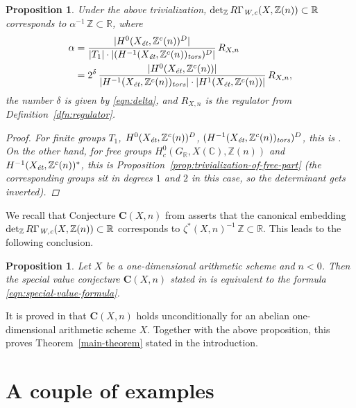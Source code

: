 \documentclass[draft]{article}
\newcommand{\CC}{\mathbb{C}}
\newcommand{\RR}{\mathbb{R}}
\newcommand{\ZZ}{\mathbb{Z}}
\renewcommand{\det}{\operatorname{det}}
\newcommand{\et}{\text{\it \'{e}t}}
\newcommand{\tors}{\text{\it tors}}
\newcommand{\Wc}{\text{\it W,c}}
\theoremstyle{myplain}
\newtheorem{proposition}[theorem]{Proposition}
\theoremstyle{mydefinition}
\numberwithin{equation}{section}
\begin{document}
\begin{proposition}
  Under the above trivialization, $\det_\ZZ R\Gamma_\Wc (X, \ZZ(n)) \subset \RR$
  corresponds to $\alpha^{-1}\,\ZZ \subset \RR$, where
  \begin{align*}
    \alpha & = \frac{|H^0 (X_\et, \ZZ^c(n))^D|}{|T_1| \cdot |(H^{-1} (X_\et, \ZZ^c(n))_\tors)^D|}\,R_{X,n} \\
           & = 2^\delta\,\frac{|H^0 (X_\et, \ZZ^c (n))|}{|H^{-1} (X_\et, \ZZ^c(n))_\tors|\cdot |H^1 (X_\et, \ZZ^c(n))|}\,R_{X,n},
  \end{align*}
  the number $\delta$ is given by \eqref{eqn:delta}, and $R_{X,n}$ is
  the regulator from Definition~\ref{dfn:regulator}.

  \begin{proof}
    For finite groups $T_1$, $H^0 (X_\et, \ZZ^c(n))^D$,
    $(H^{-1} (X_\et, \ZZ^c(n))_\tors)^D$, this is
    \cite[Lemma~A.5]{Beshenov-Weil-etale-2}. On the other hand, for free groups
    $H^0_c (G_\RR, X(\CC), \ZZ(n))$ and $H^{-1} (X_\et, \ZZ^c (n))^*$,
    this is Proposition~\ref{prop:trivialization-of-free-part} (the
    corresponding groups sit in degrees $1$ and $2$ in this case, so the
    determinant gets inverted).
  \end{proof}
\end{proposition}

We recall that Conjecture $\mathbf{C} (X,n)$ from
\cite[\S 4]{Beshenov-Weil-etale-2} asserts that the canonical embedding
$\det_\ZZ R\Gamma_\Wc (X, \ZZ(n)) \subset \RR$ corresponds to
$\zeta^* (X,n)^{-1}\,\ZZ \subset \RR$. This leads to the following conclusion.

\begin{proposition}
  Let $X$ be a one-dimensional arithmetic scheme and ${n < 0}$. Then the special
  value conjecture $\mathbf{C} (X,n)$ stated in \cite{Beshenov-Weil-etale-2} is
  equivalent to the formula \eqref{eqn:special-value-formula}.
\end{proposition}

It is proved in \cite[\S 7]{Beshenov-Weil-etale-2} that $\mathbf{C} (X,n)$ holds
unconditionally for an abelian one-dimensional arithmetic scheme $X$. Together
with the above proposition, this proves Theorem~\ref{main-theorem} stated in the
introduction.


\section{A couple of examples}
\label{sec:examples}
\end{document}
